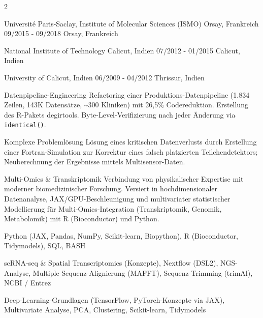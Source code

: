 \documentclass{thejus_cv}
\begin{document}
\begin{paracol}{2}

             {Universit\'e Paris-Saclay, Institute of Molecular Sciences (ISMO) Orsay, Frankreich}
             {09/2015 - 09/2018}
             {Orsay, Frankreich}
             {}

             {National Institute of Technology Calicut, Indien}
             {07/2012 - 01/2015}
             {Calicut, Indien}
             {}

             {University of Calicut, Indien}
             {06/2009 - 04/2012}
             {Thrissur, Indien}
             {}


\switchcolumn



\cvstrength{\faStar}
           {Datenpipeline-Engineering}
           {Refactoring einer Produktions-Datenpipeline (1.834 Zeilen, 143K Datens\"atze, \textasciitilde300 Kliniken) mit 26,5\% Codereduktion. Erstellung des R-Pakets degirtools. Byte-Level-Verifizierung nach jeder \"Anderung via \texttt{identical()}.}

\cvstrength{\faLightbulb}
           {Komplexe Probleml\"osung}
           {L\"osung eines kritischen Datenverlusts durch Erstellung einer Fortran-Simulation zur Korrektur eines falsch platzierten Teilchendetektors; Neuberechnung der Ergebnisse mittels Multisensor-Daten.}

\cvstrength{\faAward}
           {Multi-Omics \& Transkriptomik}
           {Verbindung von physikalischer Expertise mit moderner biomedizinischer Forschung. Versiert in hochdimensionaler Datenanalyse, JAX/GPU-Beschleunigung und multivariater statistischer Modellierung f\"ur Multi-Omics-Integration (Transkriptomik, Genomik, Metabolomik) mit R (Bioconductor) und Python.}


         {Python (JAX, Pandas, NumPy, Scikit-learn, Biopython), R (Bioconductor, Tidymodels), SQL, BASH}

         {scRNA-seq \& Spatial Transcriptomics (Konzepte), Nextflow (DSL2), NGS-Analyse, Multiple Sequenz-Alignierung (MAFFT), Sequenz-Trimming (trimAl), NCBI / Entrez}

         {Deep-Learning-Grundlagen (TensorFlow, PyTorch-Konzepte via JAX), Multivariate Analyse, PCA, Clustering, Scikit-learn, Tidymodels}


\end{paracol}
\end{document}
